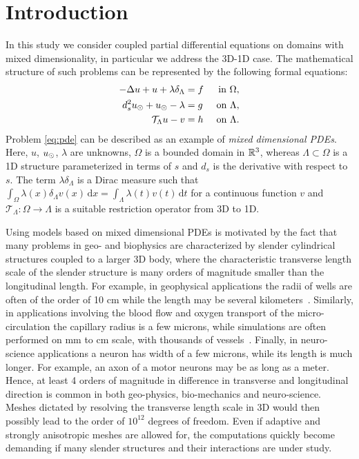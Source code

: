\documentclass[r]{siamart171218}
\begin{document}
\section{Introduction}\label{sec:intro}

In this study we consider coupled partial differential equations on domains with mixed dimensionality, in particular we address the  3D-1D case. The mathematical structure of such problems can be represented by the following formal equations:
\begin{subequations}
\label{eq:pde}
\begin{align}
\label{eq:pde1}
  -\Delta u + u + \lambda \delta_{\Lambda} &= f &\mbox{ in } \Omega,\\
\label{eq:pde2}
 d_s^2 \ud + \ud - \lambda &= g &\mbox{ on } \Lambda,\\
\label{eq:coupling}
\mathcal{T}_\Lambda u - v  &=  h &\mbox{ on } \Lambda . 
\end{align}
\end{subequations}
Problem \eqref{eq:pde} can be described as an example of \emph{mixed dimensional PDEs}.
Here, $u$, $u_{\odot}$,  $\lambda$ are unknowns,  $\Omega$ is a bounded domain in $\mathbb{R}^3$, whereas $\Lambda \subset \Omega$ is a 1D structure
parameterized in terms of $s$ and $d_s$ is the derivative with respect to $s$. 
The term $\lambda\delta_{\Lambda}$ is a Dirac measure such that 
$\int_{\Omega}\lambda(x)\delta_{\Lambda}v(x)\,\mathrm{d}x=\int_{\Lambda}\lambda(t)v(t) \,\mathrm{d}t$
for a continuous function $v$ and $\mathcal{T}_\Lambda: \Omega\rightarrow\Lambda$ is a suitable restriction operator from 3D to 1D. 

Using models based on mixed dimensional PDEs is motivated by the fact that many problems in geo- and biophysics are characterized by slender cylindrical structures coupled to a larger 3D body, where the characteristic transverse length scale of the slender structure is many orders of magnitude smaller than the longitudinal length.  For example, in geophysical applications the radii of wells are often of the order of 10 cm while the length may be several kilometers~\cite{Peaceman1978183, Peaceman1983531}. Similarly, in applications involving the blood flow and oxygen transport of the micro-circulation the capillary radius is a few microns, while simulations are often performed on mm to cm scale, with thousands of vessels~\cite{berg2020modelling,fang2008oxygen,gould2017capillary, secomb2004green}. Finally, in neuro-science applications a neuron has width of a few microns, while  its length is much longer. For example, an axon of a motor neurons may be as long as a meter.  Hence,  at least 4 orders of magnitude in difference in transverse and longitudinal direction is common in both geo-physics, bio-mechanics and neuro-science. Meshes dictated by resolving the transverse length scale in 3D would then possibly lead to the order of $10^{12}$ degrees of freedom. Even if adaptive and strongly anisotropic meshes are allowed for, the computations quickly become demanding if many slender structures and their interactions are under study.  
\end{document}
